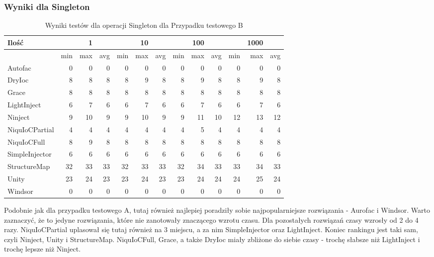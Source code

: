 \documentclass[12pt]{article}
\begin{document}
\subsubsection{Wyniki dla Singleton}
\begin{table}[H]
\captionsetup{belowskip=0pt,aboveskip=0pt}
\begin{center}
\begin{small}
	\begin{tabular}{ | l | r r r | r r r | r r r | r r r | }
    		\hline
Ilość & & 1 & & & 10 & & & 100 & & & 1000 & \\ \hline
 & min & max & avg & min & max & avg & min & max & avg & min & max & avg \\ \hline
Autofac & 0 & 0 & 0 & 0 & 0 & 0 & 0 & 0 & 0 & 0 & 0 & 0 \\ \hline
DryIoc & 8 & 8 & 8 & 8 & 9 & 8 & 8 & 9 & 8 & 8 & 9 & 8 \\ \hline
Grace & 8 & 8 & 8 & 8 & 8 & 8 & 8 & 8 & 8 & 8 & 8 & 8 \\ \hline
LightInject & 6 & 7 & 6 & 6 & 7 & 6 & 6 & 7 & 6 & 6 & 7 & 6 \\ \hline
Ninject & 9 & 10 & 9 & 9 & 10 & 9 & 9 & 11 & 10 & 12 & 13 & 12 \\ \hline
NiquIoCPartial & 4 & 4 & 4 & 4 & 4 & 4 & 4 & 5 & 4 & 4 & 4 & 4 \\ \hline
NiquIoCFull & 8 & 9 & 8 & 8 & 8 & 8 & 8 & 8 & 8 & 8 & 8 & 8 \\ \hline
SimpleInjector & 6 & 6 & 6 & 6 & 6 & 6 & 6 & 6 & 6 & 6 & 6 & 6 \\ \hline
StructureMap & 32 & 33 & 33 & 32 & 33 & 33 & 32 & 34 & 33 & 33 & 34 & 33 \\ \hline
Unity & 23 & 24 & 23 & 23 & 24 & 23 & 23 & 24 & 24 & 24 & 25 & 24 \\ \hline
Windsor & 0 & 0 & 0 & 0 & 0 & 0 & 0 & 0 & 0 & 0 & 0 & 0 \\ \hline
  	\end{tabular}
\end{small}
\end{center}
\caption{Wyniki testów dla operacji Singleton dla Przypadku testowego B}
\label{TestCaseB_Singleton}
\end{table}

Podobnie jak dla przypadku testowego A, tutaj również najlepiej poradziły sobie najpopularniejsze rozwiązania - Aurofac i Windsor. Warto zaznaczyć, że to jedyne rozwiązania, które nie zanotowały znaczącego wzrotu czasu. Dla pozostałych rozwiązań czasy wzrosły od 2 do 4 razy. NiquIoCPartial uplasował się tutaj również na 3 miejscu, a za nim SimpleInjector oraz LightInject. Koniec rankingu jest taki sam, czyli Ninject, Unity i StructureMap. NiquIoCFull, Grace, a także DryIoc miały zbliżone do siebie czasy - trochę słabsze niż LightInject i trochę lepsze niż Ninject.
\end{document}

